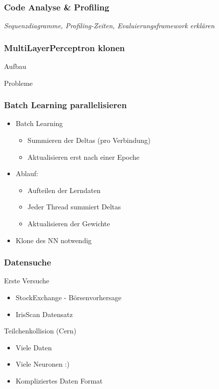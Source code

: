 \documentclass[18pt]{beamer}
\begin{document}
	\begin{frame}[c]\frametitle{Code Analyse \& Profiling}
		\begin{block}{}
			\begin{center}
			\textit{Sequenzdiagramme, Profiling-Zeiten, Evaluierungsframework erklären}
			\end{center}
		\end{block}
	\end {frame}
	
	\begin{frame}[c]\frametitle{MultiLayerPerceptron klonen}
		\begin{block}{Aufbau}
			
		\end{block}
		\begin{block}{Probleme}
		
		\end{block}
	\end {frame}

	\begin{frame}[c]\frametitle{Batch Learning parallelisieren}

		\begin{itemize}
			\item Batch Learning
			\begin{itemize}
				\item Summieren der Deltas (pro Verbindung)
				\item Aktualisieren erst nach einer Epoche
			\end{itemize}
			\item Ablauf:
			\begin{itemize}
				\item Aufteilen der Lerndaten
				\item Jeder Thread summiert Deltas
				\item Aktualisieren der Gewichte
			\end{itemize}
			\item Klone des NN notwendig
		\end{itemize}
	\end {frame}
	
	\begin{frame}[c]\frametitle{Datensuche}
		\begin{block}{Erste Versuche}
		    \begin{itemize}
		    	\item StockExchange - Börsenvorhersage
		    	\item IrisScan Datensatz
		    \end{itemize}
		\end{block}
		\begin{block}{Teilchenkollision (Cern)}
		    \begin{itemize}
		    	\item Viele Daten
		    	\item Viele Neuronen :)
		    	\item Kompliziertes Daten Format
		    \end{itemize}
		\end{block}
	\end{frame}
	
\end{document}
